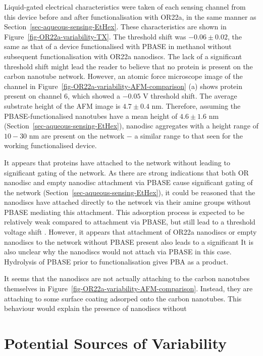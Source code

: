 \documentclass[
  a4paper,
]{scrbook}
\begin{document}
Liquid-gated electrical characteristics were taken of each sensing
channel from this device before and after functionalisation with OR22a,
in the same manner as Section~\ref{sec-aqueous-sensing-EtHex}. These
characteristics are shown in Figure~\ref{fig-OR22a-variability-TX}. The
threshold shift was \(-0.06\pm0.02\), the same as that of a device
functionalised with PBASE in methanol without subsequent
functionalisation with OR22a nanodiscs. The lack of a significant
threshold shift might lead the reader to believe that no protein is
present on the carbon nanotube network. However, an atomic force
microscope image of the channel in
Figure~\ref{fig-OR22a-variability-AFM-comparison} (a) shows protein
present on channel 6, which showed a \(-0.05\) V threshold shift. The
average substrate height of the AFM image is \(4.7\pm0.4\) nm.
Therefore, assuming the PBASE-functionalised nanotubes have a mean
height of \(4.6\pm1.6\) nm (Section~\ref{sec-aqueous-sensing-EtHex}),
nanodisc aggregates with a height range of \(10-30\) nm are present on
the network \(-\) a similar range to that seen for the working
functionalised device.

It appears that proteins have attached to the network without leading to
significant gating of the network. As there are strong indications that
both OR nanodisc and empty nanodisc attachment via PBASE cause
significant gating of the network
(Section~\ref{sec-aqueous-sensing-EtHex}), it could be reasoned that the
nanodiscs have attached directly to the network via their amine groups
without PBASE mediating this attachment. This adsorption process is
expected to be relatively weak compared to attachment via PBASE, but
still lead to a threshold voltage shift \autocite{Bradley2004}. However,
it appears that attachment of OR22a nanodiscs or empty nanodiscs to the
network without PBASE present also leads to a significant It is also
unclear why the nanodiscs would not attach via PBASE in this case.
Hydrolysis of PBASE prior to functionalisation gives PBA as a product.

It seems that the nanodiscs are not actually attaching to the carbon
nanotubes themselves in
Figure~\ref{fig-OR22a-variability-AFM-comparison}. Instead, they are
attaching to some surface coating adsorped onto the carbon nanotubes.
This behaviour would explain the presence of nanodiscs without

\hypertarget{sec-contamination}{%
\section{Potential Sources of Variability}\label{sec-contamination}}
\end{document}
